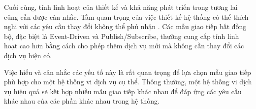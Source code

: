 Cuối cùng, tính linh hoạt của thiết kế và khả năng phát triển trong tương lai cũng cần được cân nhắc. Tầm quan trọng của việc thiết kế hệ thống có thể thích nghi với các yêu cầu thay đổi không thể phủ nhận \cite{newman2015}. Các mẫu giao tiếp bất đồng bộ, đặc biệt là Event-Driven và Publish/Subscribe, thường cung cấp tính linh hoạt cao hơn bằng cách cho phép thêm dịch vụ mới mà không cần thay đổi các dịch vụ hiện có.

Việc hiểu và cân nhắc các yếu tố này là rất quan trọng để lựa chọn mẫu giao tiếp phù hợp cho một hệ thống vi dịch vụ cụ thể. Thông thường, một hệ thống vi dịch vụ hiệu quả sẽ kết hợp nhiều mẫu giao tiếp khác nhau để đáp ứng các yêu cầu khác nhau của các phần khác nhau trong hệ thống.